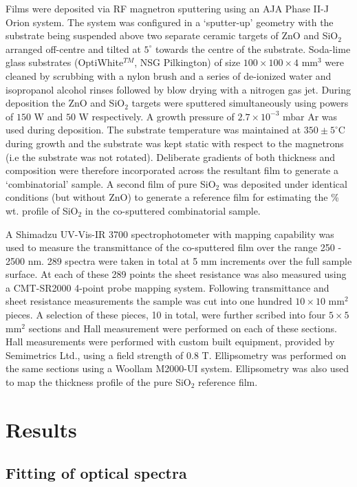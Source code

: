 \documentclass[aps,prl,preprint,showpacs,showkeys, linenumbers]{revtex4-1}
\begin{document}
Films were deposited via RF magnetron sputtering using an AJA Phase II-J Orion system. The system was configured in a `sputter-up' geometry with the substrate being suspended above two separate ceramic targets of ZnO and SiO$_2$ arranged off-centre and tilted at $5^{\circ}$ towards the centre of the substrate.  Soda-lime glass substrates (OptiWhite$^{TM}$, NSG Pilkington) of size $100\times100\times4$ mm$^{3}$ were cleaned by scrubbing with a nylon brush and a series of de-ionized water and isopropanol alcohol rinses followed by blow drying with a nitrogen gas jet. During deposition the ZnO and SiO$_2$ targets were sputtered simultaneously using powers of $150$ W and $50$ W respectively. A growth pressure of $2.7\times10^{-3}$ mbar Ar was used during deposition. The substrate temperature was maintained at $350\pm5^{\circ}$C during growth and the substrate was kept static with respect to the magnetrons (i.e the substrate was not rotated). Deliberate gradients of both thickness and composition were therefore incorporated across the resultant film to generate a `combinatorial' sample. A second film of pure SiO$_{2}$ was deposited under identical conditions (but without ZnO) to generate a reference film for estimating the \% wt. profile of SiO$_{2}$ in the co-sputtered combinatorial sample.

A Shimadzu UV-Vis-IR 3700 spectrophotometer with mapping capability was used to measure the transmittance of the co-sputtered film over the range 250 - 2500 nm. 289 spectra were taken in total at 5 mm increments over the full sample surface. At each of these 289 points the sheet resistance was also measured using a CMT-SR2000 4-point probe mapping system. Following transmittance and sheet resistance measurements the sample was cut into one hundred $10\times10$ mm$^2$ pieces. A selection of these pieces, 10 in total, were further scribed into four $5\times5$ mm$^2$ sections and Hall measurement were performed on each of these sections. Hall measurements were performed with custom built equipment, provided by Semimetrics Ltd., using a field strength of 0.8 T.  Ellipsometry was performed on the same sections using a Woollam M2000-UI system. Ellipsometry was also used to map the thickness profile of the pure SiO$_{2}$ reference film.

\section{Results}\label{sec:2}

\subsection{Fitting of optical spectra}\label{sec:2.1}
\end{document}
